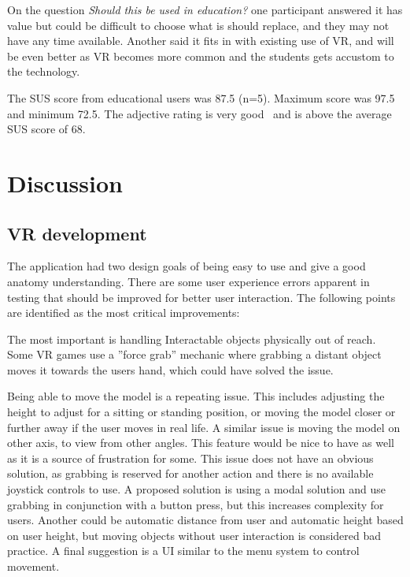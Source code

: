 \documentclass[a4paper]{report}
\begin{document}
On the question \emph{Should this be used in education?} one participant answered it has value but could be difficult to choose what is should replace, and they may not have any time available. Another said it fits in with existing use of VR, and will be even better as VR becomes more common and the students gets accustom to the technology.

The SUS score from educational users was 87.5 (n=5). Maximum score was 97.5 and minimum 72.5. The adjective rating is very good~\cite{bangor_empirical_2008} and is above the average SUS score of 68.





\section{Discussion}

\subsection{VR development}

The application had two design goals of being easy to use and give a good anatomy understanding.
There are some user experience errors apparent in testing that should be improved for better user interaction. The following points are identified as the most critical improvements:

The most important is handling Interactable objects physically out of reach. Some VR games use a ''force grab'' mechanic where grabbing a distant object moves it towards the users hand, which could have solved the issue.

Being able to move the model is a repeating issue. This includes adjusting the height to adjust for a sitting or standing position, or moving the model closer or further away if the user moves in real life. A similar issue is moving the model on other axis, to view from other angles. This feature would be nice to have as well as it is a source of frustration for some.
This issue does not have an obvious solution, as grabbing is reserved for another action and there is no available joystick controls to use. A proposed solution is using a modal solution and use grabbing in conjunction with a button press, but this increases complexity for users. Another could be automatic distance from user and automatic height based on user height, but moving objects without user interaction is considered bad practice. A final suggestion is a UI similar to the menu system to control movement.
\end{document}
